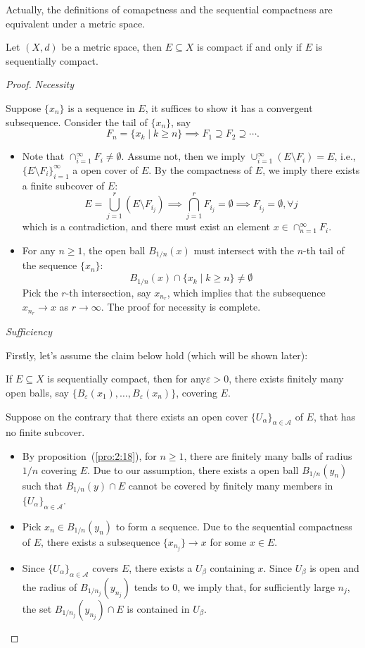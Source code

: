 Actually, the definitions of comapctness and the sequential compactness are equivalent under a metric space.

\begin{theorem}
Let $(X,d)$ be a metric space, then $E\subseteq X$ is compact if and only if $E$ is sequentially compact.
\end{theorem}

\begin{proof}

\textit{Necessity}

Suppose $\{x_n\}$ is a sequence in $E$, it suffices to show it has a convergent subsequence. 
Consider the tail of $\{x_n\}$, say 
\[
F_n=\{x_k\mid k\ge n\}\implies F_1\supseteq F_2\supseteq\cdots.
\]
\begin{itemize}
\item
Note that $\cap_{i=1}^\infty F_i\ne\emptyset$. 
Assume not, then we imply $\cup_{i=1}^\infty(E\setminus F_i)=E$, i.e., $\{E\setminus F_i\}_{i=1}^\infty$ a open cover of $E$. 
By the compactness of $E$, we imply there exists a finite subcover of $E$:
\[
E=\bigcup_{j=1}^r(E\setminus F_{i_j})\implies \bigcap_{j=1}^rF_{i_j}=\emptyset\implies F_{i_j}=\emptyset,\forall j
\]
which is a contradiction, and there must exist an element $x\in\cap_{n=1}^\infty F_i$.
\item
For any $n\ge1$, the open ball $B_{1/n}(x)$ must intersect with the $n$-th tail of the sequence $\{x_n\}$:
\[
B_{1/n}(x)\cap\{x_k\mid k\ge n\}\ne\emptyset
\]
Pick the $r$-th intersection, say $x_{n_r}$, which implies that the subsequence $x_{n_r}\to x$ as $r\to\infty$. The proof for necessity is complete.
\end{itemize}

\textit{Sufficiency}

Firstly, let's assume the claim below hold (which will be shown later):
\begin{proposition}\label{pro:2:18}
If $E\subseteq X$ is sequentially compact, then for any$\varepsilon>0$, there exists finitely many open balls, say $\{B_{\varepsilon}(x_1),\dots,B_{\varepsilon}(x_n)\}$, covering $E$.
\end{proposition}

Suppose on the contrary that there exists an open cover $\{U_\alpha\}_{\alpha\in\mathcal{A}}$ of $E$, that has no finite subcover.
\begin{itemize}
\item
By proposition~(\ref{pro:2:18}), for $n\ge1$, there are finitely many balls of radius $1/n$ covering $E$. Due to our assumption, there exists a open ball $B_{1/n}(y_n)$ such that $B_{1/n}(y)\cap E$ cannot be covered by finitely many members in $\{U_\alpha\}_{\alpha\in\mathcal{A}}$.
\item
Pick $x_n\in B_{1/n}(y_n)$ to form a sequence. Due to the sequential compactness of $E$, there exists a subsequence $\{x_{n_j}\}\to x$ for some $x\in E$. 
\item
Since $\{U_\alpha\}_{\alpha\in\mathcal{A}}$ covers $E$, there exists a $U_\beta$ containing $x$.
Since $U_\beta$ is open and the radius of $B_{1/n_j}(y_{n_j})$ tends to 0, we imply that,
for sufficiently large $n_j$, the set $B_{1/n_j}(y_{n_j})\cap E$ is contained in $U_\beta$.


\end{itemize}
\end{proof}
